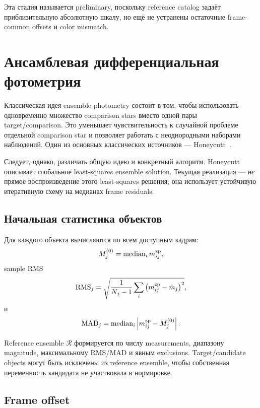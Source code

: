 Эта стадия называется preliminary, поскольку reference catalog задаёт приблизительную абсолютную шкалу, но ещё не устранены остаточные frame-common offsets и color mismatch.

\section{Ансамблевая дифференциальная фотометрия}
\label{sec:ensemble-math}

Классическая идея ensemble photometry состоит в том, чтобы использовать одновременно множество comparison stars вместо одной пары target/comparison. Это уменьшает чувствительность к случайной проблеме отдельной comparison star и позволяет работать с неоднородными наборами наблюдений. Один из основных классических источников --- Honeycutt~\cite{honeycutt1992}.

Следует, однако, различать общую идею и конкретный алгоритм. Honeycutt описывает глобальное least-squares ensemble solution. Текущая реализация \program{} --- \emph{не} прямое воспроизведение этого least-squares решения; она использует устойчивую итеративную схему на медианах frame residuals.

\subsection{Начальная статистика объектов}

Для каждого объекта вычисляются по всем доступным кадрам:
\begin{equation}
  M_j^{(0)}=\operatorname{median}_{i}m^{\rm zp}_{ij},
\end{equation}
sample RMS
\begin{equation}
  \mathrm{RMS}_j
  =\sqrt{\frac{1}{N_j-1}
  \sum_i\left(m^{\rm zp}_{ij}-\bar m_j\right)^2},
\end{equation}
и
\begin{equation}
  \mathrm{MAD}_j
  =\operatorname{median}_{i}
  \left|m^{\rm zp}_{ij}-M_j^{(0)}\right|.
\end{equation}

Reference ensemble $\mathcal R$ формируется по числу measurements, диапазону magnitude, максимальному RMS/MAD и явным exclusions. Target/candidate objects могут быть исключены из reference ensemble, чтобы собственная переменность кандидата не участвовала в нормировке.

\subsection{Frame offset}

